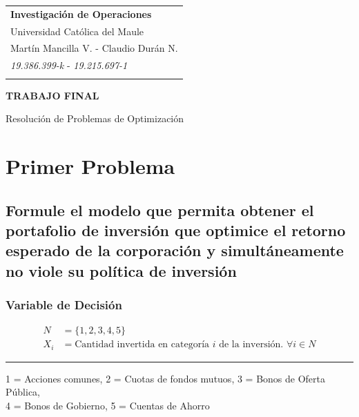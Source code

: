 \documentclass[a4paper,12pt]{article}
\begin{document}
	
\thispagestyle{empty}

\begin{tabular}{p{15.5cm}}
	{\large \bf Investigación de Operaciones} \\
	Universidad Católica del Maule \\ Martín Mancilla V. - Claudio Durán N.\\
	\textit{19.386.399-k} - \textit{19.215.697-1} \\
	\hline
	\\
\end{tabular}

\vspace*{0.3cm}

\begin{center}
	{\Large \bf TRABAJO FINAL} 
	\vspace{2mm}
	
	{Resolución de Problemas de Optimización}
	
\end{center}  

\vspace{0.4cm}

\section{Primer Problema}
\subsection{Formule  el  modelo  que  permita  obtener  el  portafolio de  inversión  que  optimice  el  retorno  esperado  de  la	corporación y simultáneamente no viole su política de inversión}
\subsubsection{Variable de Decisión}
\begin{equation*}
	\begin{split}
		N &= \{1,2,3,4,5\} \\
		X_i & = \text{Cantidad invertida en categoría } i \text{ de la inversión. } \forall i \in N
	\end{split}
\end{equation*}
\begin{center}
	\noindent\rule{12cm}{0.4pt}
\end{center}
\begin{shadedbox}
1 = Acciones comunes, 2 = Cuotas de fondos mutuos, 3 = Bonos de Oferta Pública,\\ 4 = Bonos de Gobierno, 5 = Cuentas de Ahorro
\end{shadedbox}
\end{document}
